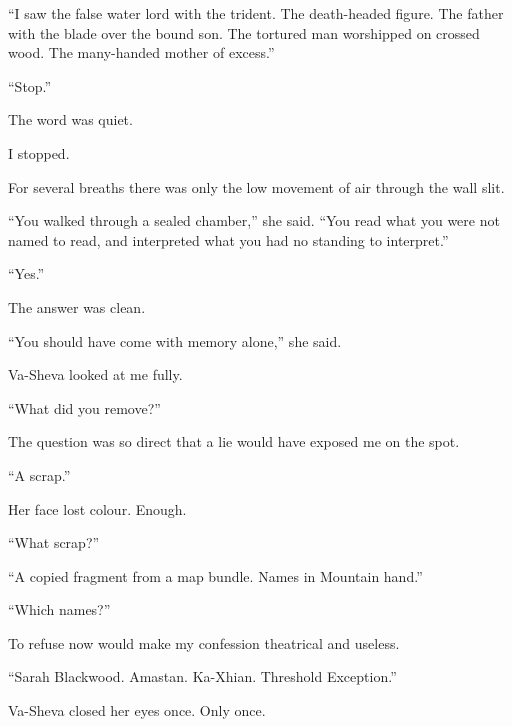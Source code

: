 ``I saw the false water lord with the trident. The death-headed figure. The father with the blade over the bound son. The tortured man worshipped on crossed wood. The many-handed mother of excess.''\par

``Stop.''\par

The word was quiet.\par

I stopped.\par

For several breaths there was only the low movement of air through the wall slit.\par

``You walked through a sealed chamber,'' she said. ``You read what you were not named to read, and interpreted what you had no standing to interpret.''\par

``Yes.''\par

The answer was clean.\par

``You should have come with memory alone,'' she said.\par

Va-Sheva looked at me fully.\par

``What did you remove?''\par

The question was so direct that a lie would have exposed me on the spot.\par

``A scrap.''\par

Her face lost colour. Enough.\par

``What scrap?''\par

``A copied fragment from a map bundle. Names in Mountain hand.''\par

``Which names?''\par

To refuse now would make my confession theatrical and useless.\par

``Sarah Blackwood. Amastan. Ka-Xhian. Threshold Exception.''\par

Va-Sheva closed her eyes once. Only once.\par

